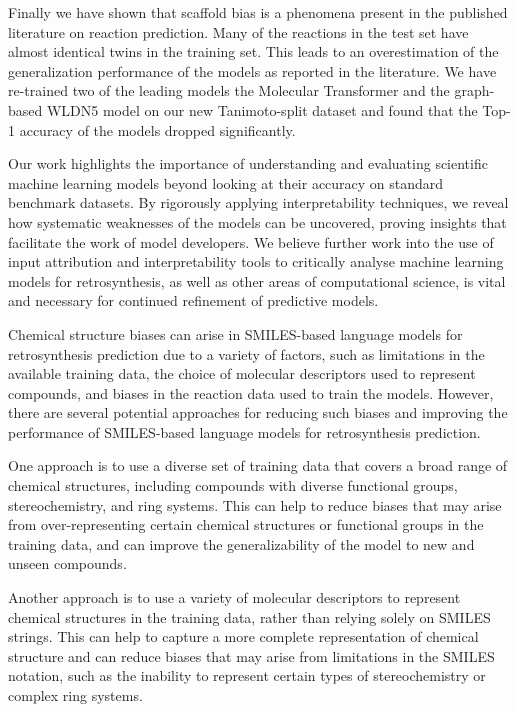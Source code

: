 Finally we have shown that scaffold bias is a phenomena present in the published literature on reaction prediction. Many of the reactions in the test set have almost identical twins in the training set. This leads to an overestimation of the generalization performance of the models as reported in the literature. We have re-trained two of the leading models the Molecular Transformer and the graph-based WLDN5 model on our new Tanimoto-split dataset and found that the Top-1 accuracy of the models dropped significantly.

Our work highlights the importance of understanding and evaluating scientific machine learning models beyond looking at their accuracy on standard benchmark datasets. By rigorously applying interpretability techniques, we reveal how systematic weaknesses of the models can be uncovered, proving insights that facilitate the work of model developers. We believe further work into the use of input attribution and interpretability tools to critically analyse machine learning models for retrosynthesis, as well as other areas of computational science, is vital and necessary for continued refinement of predictive models.

Chemical structure biases can arise in SMILES-based language models for retrosynthesis prediction due to a variety of factors, such as limitations in the available training data, the choice of molecular descriptors used to represent compounds, and biases in the reaction data used to train the models. However, there are several potential approaches for reducing such biases and improving the performance of SMILES-based language models for retrosynthesis prediction.

One approach is to use a diverse set of training data that covers a broad range of chemical structures, including compounds with diverse functional groups, stereochemistry, and ring systems. This can help to reduce biases that may arise from over-representing certain chemical structures or functional groups in the training data, and can improve the generalizability of the model to new and unseen compounds.

Another approach is to use a variety of molecular descriptors to represent chemical structures in the training data, rather than relying solely on SMILES strings. This can help to capture a more complete representation of chemical structure and can reduce biases that may arise from limitations in the SMILES notation, such as the inability to represent certain types of stereochemistry or complex ring systems.

